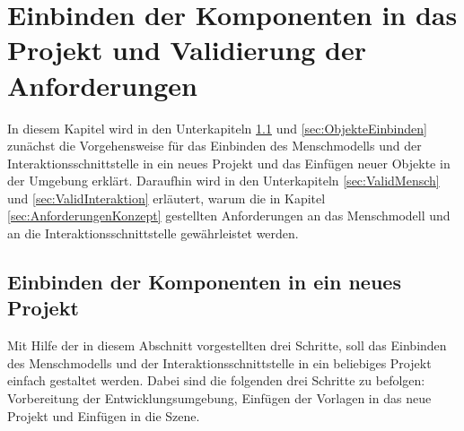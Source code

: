 \chapter{Einbinden der Komponenten in das Projekt und Validierung der Anforderungen}\label{cha:ValidierungDesKonzepts}
In diesem Kapitel wird in den Unterkapiteln \ref{sec:MenschmodellEinbinden} und \ref{sec:ObjekteEinbinden} zunächst die Vorgehensweise für das Einbinden des Menschmodells und der Interaktionsschnittstelle in ein neues Projekt und das Einfügen neuer Objekte in der Umgebung erklärt. Daraufhin wird in den Unterkapiteln \ref{sec:ValidMensch} und \ref{sec:ValidInteraktion} erläutert, warum die in Kapitel \ref{sec:AnforderungenKonzept} gestellten Anforderungen an das Menschmodell und an die Interaktionsschnittstelle gewährleistet werden.

\section{Einbinden der Komponenten in ein neues Projekt}\label{sec:MenschmodellEinbinden}
Mit Hilfe der in diesem Abschnitt vorgestellten drei Schritte, soll das Einbinden des Menschmodells und der Interaktionsschnittstelle in ein beliebiges Projekt einfach gestaltet werden. Dabei sind die folgenden drei Schritte zu befolgen: Vorbereitung der Entwicklungsumgebung, Einfügen der Vorlagen in das neue Projekt und Einfügen in die Szene.

